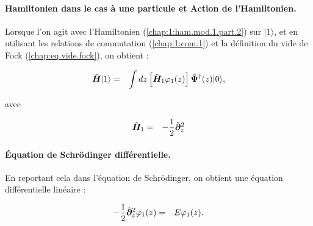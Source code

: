 \paragraph{Hamiltonien dans le cas à une particule et Action de l’Hamiltonien. }

Lorsque l’on agit avec l’Hamiltonien (\ref{chap:1:ham.mod.1.part.2}) sur \(\vert 1 \rangle\), et en utilisant les relations de commutation (\ref{chap:1:com.1}) et la définition du vide de Fock (\ref{chap:eq.vide.fock}), on obtient : 

\begin{eqnarray}
	\hat{\bm{H}}\vert 1 \rangle & = & \int dz \left [\hat{\bm{H}}_1  \varphi_{1}(z)  \right ] \hat{\bm{\Psi}}^\dag (z)	 \vert 0 \rangle,	
\end{eqnarray}

avec 

\begin{eqnarray*}
		\hat{\bm{H}}_1 & = & - \frac{1}{2} \hat{\bm{\partial}}_z^2
\end{eqnarray*}


\paragraph{Équation de Schrödinger différentielle.}

En reportant cela dans l’équation de Schrödinger, on obtient une équation différentielle linéaire :

\begin{eqnarray}
	- \frac{1}{2} \hat{\bm{\partial}}_z^2 \varphi_1(z) & = & E \varphi_1(z). \label{chap:eq.onebody.schrod}
\end{eqnarray}





